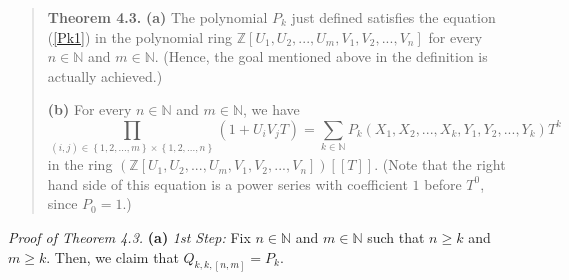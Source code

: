 \documentclass[12pt,final,notitlepage,onecolumn,german]{article}%
\begin{document}
\begin{quote}
\textbf{Theorem 4.3.} \textbf{(a)} The polynomial $P_{k}$ just defined
satisfies the equation (\ref{Pk1}) in the polynomial ring $\mathbb{Z}\left[
U_{1},U_{2},...,U_{m},V_{1},V_{2},...,V_{n}\right]  $ for every $n\in
\mathbb{N}$ and $m\in\mathbb{N}$. (Hence, the goal mentioned above in the
definition is actually achieved.)

\textbf{(b)} For every $n\in\mathbb{N}$ and $m\in\mathbb{N}$, we have%
\begin{equation}
\prod_{\left(  i,j\right)  \in\left\{  1,2,...,m\right\}  \times\left\{
1,2,...,n\right\}  }\left(  1+U_{i}V_{j}T\right)  =\sum_{k\in\mathbb{N}}%
P_{k}\left(  X_{1},X_{2},...,X_{k},Y_{1},Y_{2},...,Y_{k}\right)  T^{k}
\label{Pk2}%
\end{equation}
in the ring $\left(  \mathbb{Z}\left[  U_{1},U_{2},...,U_{m},V_{1}%
,V_{2},...,V_{n}\right]  \right)  \left[  \left[  T\right]  \right]  $. (Note
that the right hand side of this equation is a power series with coefficient
$1$ before $T^{0}$, since $P_{0}=1$.)
\end{quote}

\textit{Proof of Theorem 4.3.} \textbf{(a)} \textit{1st Step:} Fix
$n\in\mathbb{N}$ and $m\in\mathbb{N}$ such that $n\geq k$ and $m\geq k$. Then,
we claim that $Q_{k,k,\left[  n,m\right]  }=P_{k}$.
\end{document}

